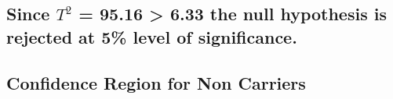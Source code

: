 \documentclass[]{article}
\begin{document}
\hypertarget{since-t2-95.16-6.33-the-null-hypothesis-is-rejected-at-5-level-of-significance.}{%
\subsection{\texorpdfstring{Since \(T^2\) = 95.16 \textgreater{} 6.33
the null hypothesis is rejected at 5\% level of
significance.}{Since T\^{}2 = 95.16 \textgreater{} 6.33 the null hypothesis is rejected at 5\% level of significance.}}\label{since-t2-95.16-6.33-the-null-hypothesis-is-rejected-at-5-level-of-significance.}}

\hypertarget{confidence-region-for-non-carriers}{%
\subsection{Confidence Region for Non
Carriers}\label{confidence-region-for-non-carriers}}
\end{document}
